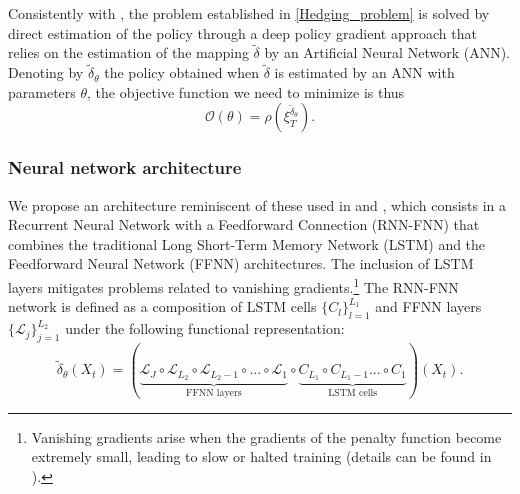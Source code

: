 \documentclass[12pt]{article}
\begin{document}
Consistently with \cite{buehler2019deep}, the problem established in \eqref{Hedging_problem} is solved by direct estimation of the policy through a deep policy gradient approach that relies on the estimation of the mapping $\tilde{\delta}$ by an Artificial Neural Network (ANN). Denoting by $\tilde{\delta}_{\theta}$ the policy obtained when $\tilde{\delta}$ is estimated by an ANN with parameters $\theta$, the objective function we need to minimize is thus
\begin{equation}\label{penaltyfunction}
    \mathcal{O}(\theta) = \rho \left( \xi_{T}^{\tilde{\delta}_{\theta}} \right)\mbox{.}
\end{equation}

\subsubsection{Neural network architecture}
\label{se:NNARCHITECTURE}

We propose an architecture reminiscent of these used in \cite{koochali2019probabilistic} and \cite{fecamp2020deep}, which consists in a Recurrent Neural Network with a Feedforward Connection (RNN-FNN) that combines the traditional Long Short-Term Memory Network (LSTM) and the Feedforward Neural Network (FFNN) architectures. The inclusion of LSTM layers mitigates problems related to vanishing gradients.\footnote{Vanishing gradients arise when the gradients of the penalty function become extremely small, leading to slow or halted training (details can be found in \cite{goodfellow2016deep}).} 
The RNN-FNN network is defined as a composition of LSTM cells $\{ C_{l} \}_{l=1}^{L_{1}}$ and FFNN layers $\{ \mathcal{L}_{j} \}_{j=1}^{L_{2}}$ under the following functional representation:
\begin{equation*}
    \tilde{\delta}_{\theta}(X_{t})=(\underbrace{ \mathcal{L}_{J} \circ \mathcal{L}_{L_{2}}\circ \mathcal{L}_{L_{2}-1}\circ ... \circ \mathcal{L}_{1}}_{\mbox{FFNN layers}}\circ \underbrace{C_{L_{1}}\circ C_{L_{1}-1}...\circ C_{1}}_{\mbox{LSTM cells}})(X_{t}).
\end{equation*}
\end{document}
